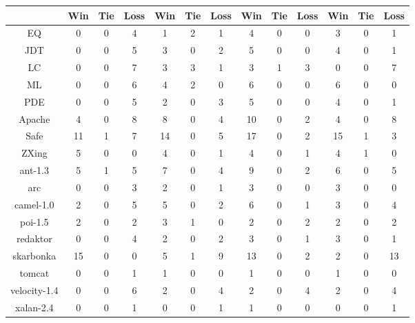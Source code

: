 \begin{table}[!t]
\begin{tabular}{|c||c|c|c||c|c|c||c|c|c||c|c|c|}
& Win & Tie & Loss & Win & Tie & Loss & Win & Tie & Loss & Win & Tie & Loss \\ \hline \hline
EQ  &0      &0      &4      &1      &2      &1      &4      &0      &0      &3      &0      &1\\ \hline
    JDT &0      &0      &5      &3      &0      &2      &5      &0      &0      &4      &0      &1\\ \hline
    LC  &0      &0      &7      &3      &3      &1      &3      &1      &3      &0      &0      &7\\ \hline
    ML  &0      &0      &6      &4      &2      &0      &6      &0      &0      &6      &0      &0\\ \hline
    PDE &0      &0      &5      &2      &0      &3      &5      &0      &0      &4      &0      &1\\ \hline
    Apache      &4      &0      &8      &8      &0      &4      &10     &0      &2      &4      &0      &8\\ \hline
    Safe        &11     &1      &7      &14     &0      &5      &17     &0      &2      &15     &1      &3\\ \hline
    ZXing       &5      &0      &0      &4      &0      &1      &4      &0      &1      &4      &1      &0\\ \hline
    ant-1.3     &5      &1      &5      &7      &0      &4      &9      &0      &2      &6      &0      &5\\ \hline
    arc &0      &0      &3      &2      &0      &1      &3      &0      &0      &3      &0      &0\\ \hline
    camel-1.0   &2      &0      &5      &5      &0      &2      &6      &0      &1      &3      &0      &4\\ \hline
    poi-1.5     &2      &0      &2      &3      &1      &0      &2      &0      &2      &2      &0      &2\\ \hline
    redaktor    &0      &0      &4      &2      &0      &2      &3      &0      &1      &3      &0      &1\\ \hline
    skarbonka   &15     &0      &0      &5      &1      &9      &13     &0      &2      &2      &0      &13\\ \hline
    tomcat      &0      &0      &1      &1      &0      &0      &1      &0      &0      &1      &0      &0\\ \hline
    velocity-1.4        &0      &0      &6      &2      &0      &4      &2      &0      &4      &2      &0      &4\\ \hline
    xalan-2.4   &0      &0      &1      &0      &0      &1      &1      &0      &0      &0      &0      &1\\ \hline

\end{tabular}
\end{table}
